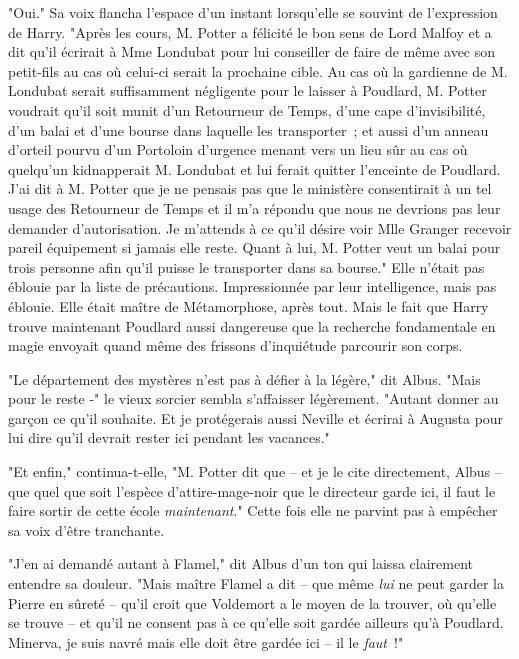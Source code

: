 "Oui." Sa voix flancha l'espace d'un instant lorsqu'elle se souvint de l'expression de Harry. "Après les cours, M. Potter a félicité le bon sens de Lord Malfoy et a dit qu'il écrirait à Mme Londubat pour lui conseiller de faire de même avec son petit-fils au cas où celui-ci serait la prochaine cible. Au cas où la gardienne de M. Londubat serait suffisamment négligente pour le laisser à Poudlard, M. Potter voudrait qu'il soit munit d'un Retourneur de Temps, d'une cape d'invisibilité, d'un balai et d'une bourse dans laquelle les transporter~; et aussi d'un anneau d'orteil pourvu d'un Portoloin d'urgence menant vers un lieu sûr au cas où quelqu'un kidnapperait M. Londubat et lui ferait quitter l'enceinte de Poudlard. J'ai dit à M. Potter que je ne pensais pas que le ministère consentirait à un tel usage des Retourneur de Temps et il m'a répondu que nous ne devrions pas leur demander d'autorisation. Je m'attends à ce qu'il désire voir Mlle Granger recevoir pareil équipement si jamais elle reste. Quant à lui, M. Potter veut un balai pour trois personne afin qu'il puisse le transporter dans sa bourse." Elle n'était pas éblouie par la liste de précautions. Impressionnée par leur intelligence, mais pas éblouie. Elle était maître de Métamorphose, après tout. Mais le fait que Harry trouve maintenant Poudlard aussi dangereuse que la recherche fondamentale en magie envoyait quand même des frissons d'inquiétude parcourir son corps.

"Le département des mystères n'est pas à défier à la légère," dit Albus. "Mais pour le reste -" le vieux sorcier sembla s'affaisser légèrement. "Autant donner au garçon ce qu'il souhaite. Et je protégerais aussi Neville et écrirai à Augusta pour lui dire qu'il devrait rester ici pendant les vacances."

"Et enfin," continua-t-elle, "M. Potter dit que -- et je le cite directement, Albus -- que quel que soit l'espèce d'attire-mage-noir que le directeur garde ici, il faut le faire sortir de cette école \emph{maintenant}." Cette fois elle ne parvint pas à empêcher sa voix d'être tranchante.

"J'en ai demandé autant à Flamel," dit Albus d'un ton qui laissa clairement entendre sa douleur. "Mais maître Flamel a dit -- que même \emph{lui} ne peut garder la Pierre en sûreté -- qu'il croit que Voldemort a le moyen de la trouver, où qu'elle se trouve -- et qu'il ne consent pas à ce qu'elle soit gardée ailleurs qu'à Poudlard. Minerva, je suis navré mais elle doit être gardée ici -- il le \emph{faut}~!"

